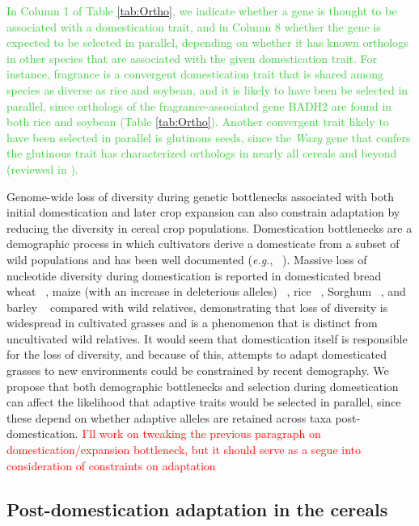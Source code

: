 \documentclass[12pt]{article}
\newcommand{\mbh}[1]{\textcolor{red}{\normalsize  #1}}
\newcommand{\mw}[1]{\textcolor{LimeGreen}{\normalsize #1}}
\begin{document}
\mw{In Column 1 of Table \ref{tab:Ortho}, we indicate whether a gene is thought to be associated with a domestication trait, and in Column 8 whether the gene is expected to be selected in parallel, depending on whether it has known orthologs in other species that are associated with the given domestication trait. 
For instance, fragrance is a convergent domestication trait that is shared among species as diverse as rice and soybean, and it is likely to have been be selected in parallel, since orthologs of the fragrance-associated gene BADH2 are found in both rice and soybean (Table \ref{tab:Ortho}).  
Another convergent trait likely to have been selected in parallel is glutinous seeds, since the \emph{Waxy} gene that confers the glutinous trait has characterized orthologs in nearly all cereals and beyond (reviewed in \citep{Meyer2013}).}


Genome-wide loss of diversity during genetic bottlenecks associated with both initial domestication and later crop expansion can also constrain adaptation by reducing the diversity in cereal crop populations. Domestication bottlenecks are a demographic process in which cultivators derive a domesticate from a subset of wild populations and has been well documented (\emph{e.g.}, ~\citep{Wang2017}).
Massive loss of nucleotide diversity during domestication is reported in domesticated bread wheat ~\citep{Haudry2007}, maize (with an increase in deleterious alleles) ~\citep{pmid9539756, Wang2017}, rice ~\citep{pmid17218640}, Sorghum ~\citep{Hamblin2006}, and barley ~\citep{Kilian2006} compared with wild relatives, demonstrating that loss of diversity is widespread in cultivated grasses and is a phenomenon that is distinct from uncultivated wild relatives. It would seem that domestication itself is responsible for the loss of diversity, and because of this, attempts to adapt domesticated grasses to new environments could be constrained by recent demography.  
We propose that both demographic bottlenecks and selection during domestication can affect the likelihood that adaptive traits would be selected in parallel, since these depend on whether adaptive alleles are retained across taxa post-domestication. \mbh{I'll work on tweaking the previous paragraph on domestication/expansion bottleneck, but it should serve as a segue into consideration of constraints on adaptation}


\subsection*{Post-domestication adaptation in the cereals}
\end{document}
